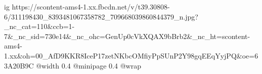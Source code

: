  
 
 
 
 

\ifcmt
  ig https://scontent-ams4-1.xx.fbcdn.net/v/t39.30808-6/311198430_8393481067358782_709668039860844379_n.jpg?_nc_cat=110&ccb=1-7&_nc_sid=730e14&_nc_ohc=GenUp0cVkXQAX9bBrb2&_nc_ht=scontent-ams4-1.xx&oh=00_AfD9KKR8IceP17zetNKbcOMfiyPpSUnP2Y98gqEEqYyjPQ&oe=63A20B9C
  @width 0.4
  @minipage 0.4
  @wrap \parpic[r]
\fi
